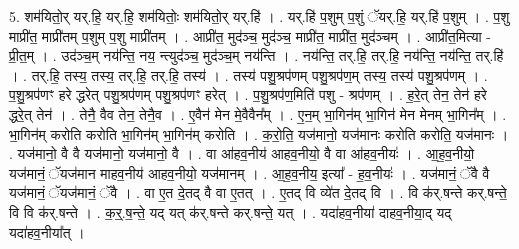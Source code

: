 \documentclass[17pt]{extarticle}
\begin{document}
5. शम॑यितो॒र् यर्.हि॒ यर्.हि॒ शम॑यितोः॒ शम॑यितो॒र् यर्.हि॑ । . यर्.हि॑ प॒शुम् प॒शुं ॅयर्.हि॒ यर्.हि॑ प॒शुम् । . प॒शु माप्री॑त॒ माप्री॑तम् प॒शुम् प॒शु माप्री॑तम् । . आप्री॑त॒ मुद॑ञ्च॒ मुद॑ञ्च॒ माप्री॑त॒ माप्री॑त॒ मुद॑ञ्चम् । . आप्री॑त॒मित्या - प्री॒त॒म् । . उद॑ञ्च॒म् नय॑न्ति॒ नय॒ न्त्युद॑ञ्च॒ मुद॑ञ्च॒म् नय॑न्ति । . नय॑न्ति॒ तर्.हि॒ तर्.हि॒ नय॑न्ति॒ नय॑न्ति॒ तर्.हि॑ । . तर्.हि॒ तस्य॒ तस्य॒ तर्.हि॒ तर्.हि॒ तस्य॑ । . तस्य॑ पशु॒श्रप॑णम् पशु॒श्रप॑ण॒म् तस्य॒ तस्य॑ पशु॒श्रप॑णम् । . प॒शु॒श्रप॑णꣳ हरे द्धरेत् पशु॒श्रप॑णम् पशु॒श्रप॑णꣳ हरेत् । . प॒शु॒श्रप॑ण॒मिति॑ पशु - श्रप॑णम् । . ह॒रे॒त् तेन॒ तेन॑ हरे द्धरे॒त् तेन॑ । . तेनै॒ वैव तेन॒ तेनै॒व । . ए॒वैन॑ मेन मे॒वैवैन᳚म् । . ए॒न॒म् भा॒गिन॑म् भा॒गिन॑ मेन मेनम् भा॒गिन᳚म् । . भा॒गिन॑म् करोति करोति भा॒गिन॑म् भा॒गिन॑म् करोति । . क॒रो॒ति॒ यज॑मानो॒ यज॑मानः करोति करोति॒ यज॑मानः । . यज॑मानो॒ वै वै यज॑मानो॒ यज॑मानो॒ वै । . वा आ॑हव॒नीय॑ आहव॒नीयो॒ वै वा आ॑हव॒नीयः॑ । . आ॒ह॒व॒नीयो॒ यज॑मानं॒ ॅयज॑मान माहव॒नीय॑ आहव॒नीयो॒ यज॑मानम् । . आ॒ह॒व॒नीय॒ इत्या᳚ - ह॒व॒नीयः॑ । . यज॑मानं॒ ॅवै वै यज॑मानं॒ ॅयज॑मानं॒ ॅवै । . वा ए॒त दे॒तद् वै वा ए॒तत् । . ए॒तद् वि व्ये॑त दे॒तद् वि । . वि क॑र्.षन्ते कर्.षन्ते॒ वि वि क॑र्.षन्ते । . क॒र्॒.ष॒न्ते॒ यद् यत् क॑र्.षन्ते कर्.षन्ते॒ यत् । . यदा॑हव॒नीया॑ दाहव॒नीया॒द् यद् यदा॑हव॒नीया᳚त् । \newline
\end{document}
